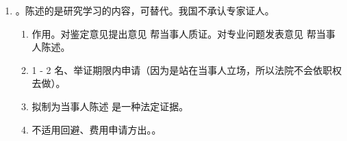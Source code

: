 \begin{enumerate}
\begin{enumerate}
\begin{enumerate}
                  \item {}。视为（私文）书证。
                        \begin{enumerate}
                          \item {}（具有证据能力）。。
                          \item 另一方。
                        \end{enumerate}
                \end{enumerate}
          \item {}。陈述的是研究学习的内容，可替代。我国不承认专家证人。
                \begin{enumerate}
                  \item 作用。\yi 对鉴定意见提出意见 \yjt 帮当事人质证。\er 对专业问题发表意见 \yjt 帮当事人陈述。
                  \item 1 - 2 名、举证期限内申请（因为是站在当事人立场，所以法院不会依职权去做）。
                  \item 拟制为当事人陈述 \yjt 是一种法定证据。
                  \item 不适用回避、费用申请方出。。
                \end{enumerate}
        \end{enumerate}
\end{enumerate}
